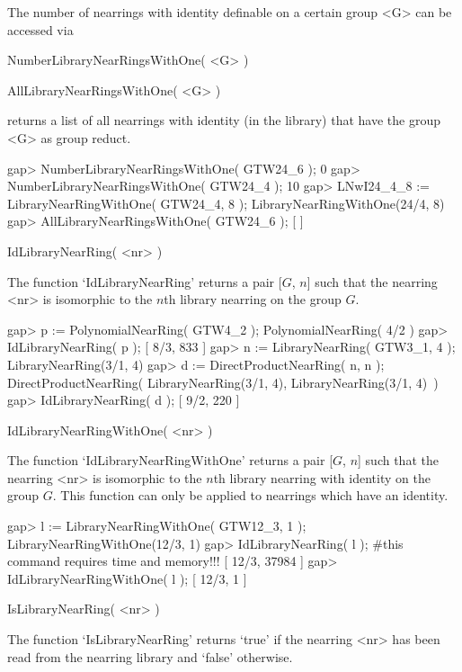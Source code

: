 The number of nearrings with identity definable on a certain group <G>
can be accessed via

\>NumberLibraryNearRingsWithOne( <G> )

\>AllLibraryNearRingsWithOne( <G> )

returns a list of all nearrings with identity (in the library) that have
the group <G> as group reduct.
 
\beginexample
    gap> NumberLibraryNearRingsWithOne( GTW24_6 );
    0
    gap> NumberLibraryNearRingsWithOne( GTW24_4 );
    10
    gap> LNwI24_4_8 := LibraryNearRingWithOne( GTW24_4, 8 );
    LibraryNearRingWithOne(24/4, 8)
    gap> AllLibraryNearRingsWithOne( GTW24_6 );
    [  ]
\endexample



\>IdLibraryNearRing( <nr> )

The function `IdLibraryNearRing' returns a pair [$G$, $n$] such that the
nearring <nr> is isomorphic to the $n$th library nearring on the group $G$.

\beginexample
    gap> p := PolynomialNearRing( GTW4_2 );
    PolynomialNearRing( 4/2 )
    gap> IdLibraryNearRing( p );
    [ 8/3, 833 ]
    gap> n := LibraryNearRing( GTW3_1, 4 );
    LibraryNearRing(3/1, 4)
    gap> d := DirectProductNearRing( n, n );
    DirectProductNearRing( LibraryNearRing(3/1, 4), LibraryNearRing(3/1, 4)\
     )
    gap> IdLibraryNearRing( d );
    [ 9/2, 220 ]
\endexample

\>IdLibraryNearRingWithOne( <nr> )

The function `IdLibraryNearRingWithOne' returns a pair [$G$, $n$] such
that the nearring <nr> is isomorphic to the $n$th library nearring with
identity on the group $G$. This function can only be applied to nearrings
which have an identity.

\beginexample
    gap> l := LibraryNearRingWithOne( GTW12_3, 1 );
    LibraryNearRingWithOne(12/3, 1)
    gap> IdLibraryNearRing( l ); #this command requires time and memory!!!
    [ 12/3, 37984 ]
    gap> IdLibraryNearRingWithOne( l );           
    [ 12/3, 1 ]
\endexample

\Section{IsLibraryNearRing}


\>IsLibraryNearRing( <nr> )

The function `IsLibraryNearRing' returns `true' if the nearring <nr> has been
read from the nearring library and `false' otherwise.

